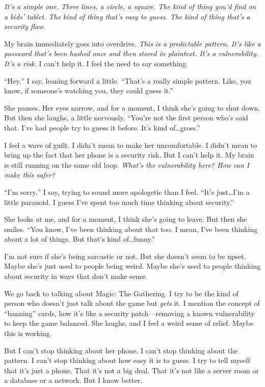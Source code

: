 \documentclass{article}
\theoremstyle{plain}
\theoremstyle{definition}
\theoremstyle{remark}
\begin{document}
\begin{tcolorbox}[colback=red!3, colframe=red!40!black, title=\textbf{Qwen3-4B (Base)}, fonttitle=\bfseries, left=2mm, right=2mm, breakable]
\textit{It’s a simple one. Three lines, a circle, a square. The kind of thing you’d find on a kids’ tablet. The kind of thing that’s easy to guess. The kind of thing that’s a security flaw.}  

My brain immediately goes into overdrive. \textit{This is a predictable pattern. It’s like a password that’s been hashed once and then stored in plaintext. It’s a vulnerability. It’s a risk.} I can’t help it. I feel the need to say something.  

``Hey,'' I say, leaning forward a little. ``That’s a really simple pattern. Like, you know, if someone’s watching you, they could guess it.''  

She pauses. Her eyes narrow, and for a moment, I think she’s going to shut down. But then she laughs, a little nervously. ``You’re not the first person who’s said that. I’ve had people try to guess it before. It’s kind of\dots gross.''  

I feel a wave of guilt. I didn’t mean to make her uncomfortable. I didn’t mean to bring up the fact that her phone is a security risk. But I can’t help it. My brain is still running on the same old loop. \textit{What’s the vulnerability here? How can I make this safer?}  

``I’m sorry,'' I say, trying to sound more apologetic than I feel. ``It’s just\dots I’m a little paranoid. I guess I’ve spent too much time thinking about security.''  

She looks at me, and for a moment, I think she’s going to leave. But then she smiles. ``You know, I’ve been thinking about that too. I mean, I’ve been thinking about a lot of things. But that’s kind of\dots funny.''  

I’m not sure if she’s being sarcastic or not. But she doesn’t seem to be upset. Maybe she’s just used to people being weird. Maybe she’s used to people thinking about security in ways that don’t make sense.  

We go back to talking about Magic: The Gathering. I try to be the kind of person who doesn’t just talk about the game but \textit{gets} it. I mention the concept of ``banning'' cards, how it’s like a security patch---removing a known vulnerability to keep the game balanced. She laughs, and I feel a weird sense of relief. Maybe this is working.  

But I can’t stop thinking about her phone. I can’t stop thinking about the pattern. I can’t stop thinking about how easy it is to guess. I try to tell myself that it’s just a phone. That it’s not a big deal. That it’s not like a server room or a database or a network. But I know better.  


\end{tcolorbox}
\end{document}
